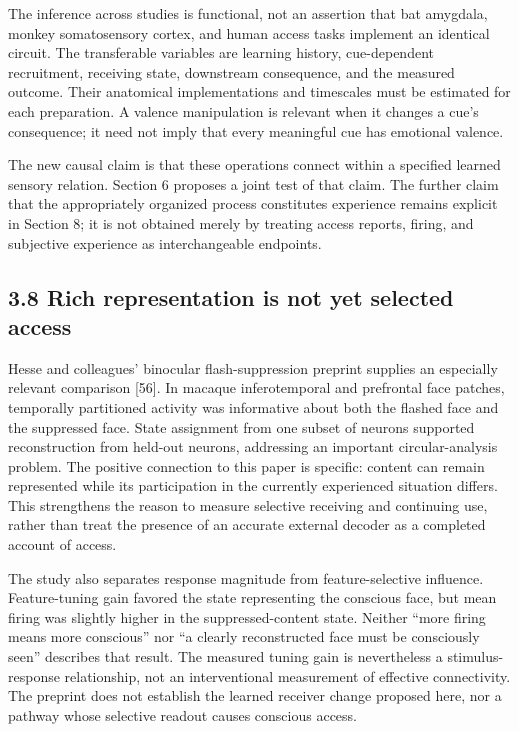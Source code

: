 \documentclass[
  american,
  11pt,
  letterpaper,
]{article}
\begin{document}
The inference across studies is functional, not an assertion that bat amygdala, monkey somatosensory cortex, and human access tasks implement an identical circuit. The transferable variables are learning history, cue-dependent recruitment, receiving state, downstream consequence, and the measured outcome. Their anatomical implementations and timescales must be estimated for each preparation. A valence manipulation is relevant when it changes a cue's consequence; it need not imply that every meaningful cue has emotional valence.

The new causal claim is that these operations connect within a specified learned sensory relation. Section 6 proposes a joint test of that claim. The further claim that the appropriately organized process constitutes experience remains explicit in Section 8; it is not obtained merely by treating access reports, firing, and subjective experience as interchangeable endpoints.

\subsection{3.8 Rich representation is not yet selected access}\label{rich-representation-is-not-yet-selected-access}

Hesse and colleagues' binocular flash-suppression preprint supplies an especially relevant comparison {[}56{]}. In macaque inferotemporal and prefrontal face patches, temporally partitioned activity was informative about both the flashed face and the suppressed face. State assignment from one subset of neurons supported reconstruction from held-out neurons, addressing an important circular-analysis problem. The positive connection to this paper is specific: content can remain represented while its participation in the currently experienced situation differs. This strengthens the reason to measure selective receiving and continuing use, rather than treat the presence of an accurate external decoder as a completed account of access.

The study also separates response magnitude from feature-selective influence. Feature-tuning gain favored the state representing the conscious face, but mean firing was slightly higher in the suppressed-content state. Neither ``more firing means more conscious'' nor ``a clearly reconstructed face must be consciously seen'' describes that result. The measured tuning gain is nevertheless a stimulus-response relationship, not an interventional measurement of effective connectivity. The preprint does not establish the learned receiver change proposed here, nor a pathway whose selective readout causes conscious access.
\end{document}
